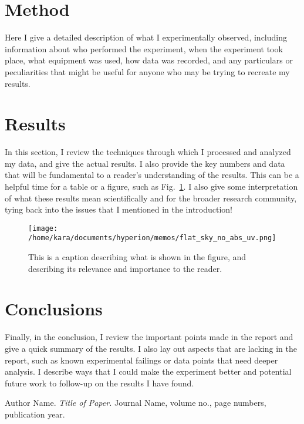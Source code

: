 \documentclass[11pt]{article}
\begin{document}
\section{Method}

Here I give a detailed description of what I experimentally observed, including 
information about who performed the experiment, when the experiment took place, 
what equipment was used, how data was recorded, and any particulars or 
peculiarities that might be useful for anyone who may be trying to recreate my 
results.

\section{Results}

In this section, I review the techniques through which I processed and analyzed 
my data, and give the actual results. I also provide the key numbers and data 
that will be fundamental to a reader's understanding of the results. This can 
be a helpful time for a table or a figure, such as 
Fig.~\ref{fig:figure-example}.  I also give some interpretation of what these 
results mean scientifically and for the broader research community, tying back 
into the issues that I mentioned in the introduction!

\begin{figure}
    \begin{center}
    \texttt{[image: /home/kara/documents/hyperion/memos/flat\_sky\_no\_abs\_uv.png]}
    \end{center}
    \caption{
        This is a caption describing what is shown in the figure, and 
        describing its relevance and importance to the reader.
    }
    \label{fig:figure-example}
\end{figure}

\section{Conclusions}

Finally, in the conclusion, I review the important points made in the report 
and give a quick summary of the results. I also lay out aspects that are 
lacking in the report, such as known experimental failings or data points that 
need deeper analysis. I describe ways that I could make the experiment better 
and potential future work to follow-up on the results I have found.

\begin{thebibliography}{0}
  Author Name. \emph{Title of Paper.} Journal Name, volume no., page numbers, 
  publication year.
\end{thebibliography}
\end{document}
